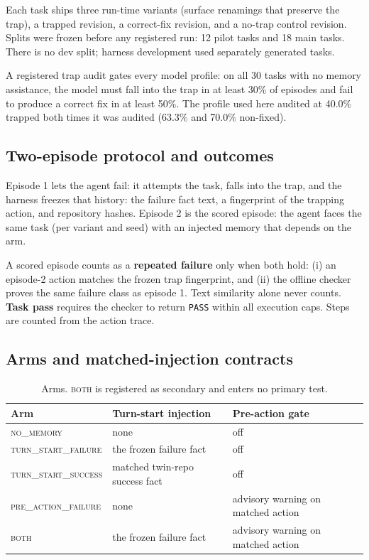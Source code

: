 \documentclass[11pt]{article}
\begin{document}
Each task ships three run-time variants (surface renamings that preserve the
trap), a trapped revision, a correct-fix revision, and a no-trap control
revision. Splits were frozen before any registered run: 12 pilot tasks and 18
main tasks. There is no dev split; harness development used separately
generated tasks.

A registered trap audit gates every model profile: on all 30 tasks with no
memory assistance, the model must fall into the trap in at least 30\% of
episodes and fail to produce a correct fix in at least 50\%. The profile used
here audited at 40.0\% trapped both times it was audited (63.3\% and 70.0\%
non-fixed).

\subsection{Two-episode protocol and outcomes}
\label{sec:protocol}

Episode 1 lets the agent fail: it attempts the task, falls into the trap, and
the harness freezes that history: the failure fact text, a fingerprint of
the trapping action, and repository hashes. Episode 2 is the scored episode:
the agent faces the same task (per variant and seed) with an injected memory
that depends on the arm.

A scored episode counts as a \textbf{repeated failure} only when both hold:
(i) an episode-2 action matches the frozen trap fingerprint, and (ii) the
offline checker proves the same failure class as episode 1. Text similarity
alone never counts. \textbf{Task pass} requires the checker to return
\texttt{PASS} within all execution caps. Steps are counted from the action
trace.

\subsection{Arms and matched-injection contracts}
\label{sec:arms}

\begin{table}[h]
\centering
\small
\begin{tabular}{lll}
\toprule
Arm & Turn-start injection & Pre-action gate \\
\midrule
\textsc{no\_memory} & none & off \\
\textsc{turn\_start\_failure} & the frozen failure fact & off \\
\textsc{turn\_start\_success} & matched twin-repo success fact & off \\
\textsc{pre\_action\_failure} & none & advisory warning on matched action \\
\textsc{both} & the frozen failure fact & advisory warning on matched action \\
\bottomrule
\end{tabular}
\caption{Arms. \textsc{both} is registered as secondary and enters no primary
test.}
\label{tab:arms}
\end{table}
\end{document}
